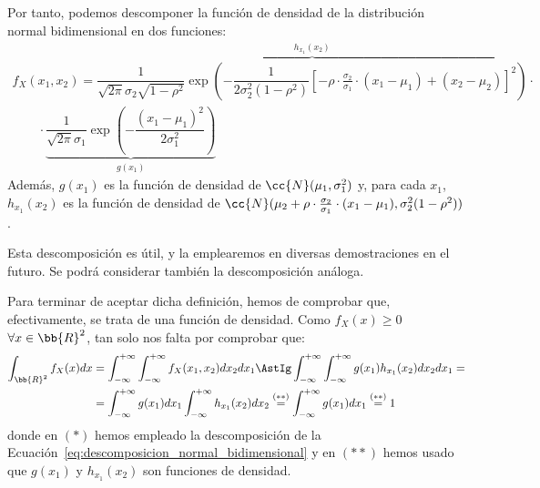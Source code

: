 Por tanto, podemos descomponer la función de densidad de la distribución normal bidimensional en dos funciones:
\begin{multline}\label{eq:descomposicion_normal_bidimensional}
    f_X(x_1,x_2)
    =\overbrace{\dfrac{1}{\sqrt{2\pi}\sigma_2\sqrt{1-\rho^2}}\exp\left(-\dfrac{1}{2\sigma_2^2(1-\rho^2)}\left[-\rho\cdot \frac{\sigma_2}{\sigma_1}\cdot (x_1-\mu_1)+ (x_2-\mu_2)\right]^2\right)}^{h_{x_1}(x_2)}
    \cdot\\\qquad \cdot \underbrace{\dfrac{1}{\sqrt{2\pi}\sigma_1}\exp\left(-\dfrac{(x_1-\mu_1)^2}{2\sigma_1^2}\right)}_{g(x_1)}
\end{multline}
Además, $g(x_1)$ es la función de densidad de $\cc{N}(\mu_1, \sigma_1^2)$ y, para cada $x_1$, $h_{x_1}(x_2)$ es la función de densidad de $\cc{N}(\mu_2+\rho\cdot \frac{\sigma_2}{\sigma_1}\cdot (x_1-\mu_1), \sigma_2^2(1-\rho^2))$.\\
\begin{comment}
Repitiendo el proceso con el término $\left(\frac{x_2-\mu_2}{\sigma_2}\right)^2$, obtenemos que:
\begin{align*}
    f_X(x_1,x_2)
    &=\overbrace{\dfrac{1}{\sqrt{2\pi}\sigma_2}\exp\left(-\dfrac{(x_2-\mu_2)^2}{2\sigma_2^2}\right)}^{p(x_2)}\cdot
    \cdot\\&\qquad \cdot\underbrace{\dfrac{1}{\sqrt{2\pi}\sigma_1\sqrt{1-\rho^2}}\exp\left(-\dfrac{1}{2\sigma_1^2(1-\rho^2)}\left[-\rho\cdot \frac{\sigma_1}{\sigma_2}\cdot (x_2-\mu_2)+ (x_1-\mu_1)\right]^2\right)}_{q_{x_2}(x_1)}
\end{align*}
En este caso, $p(x_2)$ es la función de densidad de $\cc{N}(\mu_2, \sigma_2^2)$ y, para cada $x_2$, $q_{x_2}(x_1)$ es la función de densidad de $\cc{N}(\mu_1+\rho\cdot \frac{\sigma_1}{\sigma_2}\cdot (x_2-\mu_2), \sigma_1^2(1-\rho^2))$.
\end{comment}
Esta descomposición es útil, y la emplearemos en diversas demostraciones en el futuro. Se podrá considerar también la descomposición análoga.


Para terminar de aceptar dicha definición, hemos de comprobar que, efectivamente, se trata de una función de densidad.
Como $f_X(x)\geq 0$ $\forall x\in \bb{R}^2$, tan solo nos falta por comprobar que:
\begin{align*}
    \int_{\bb{R}^2} f_X(x)dx
    &= \int_{-\infty}^{+\infty}\int_{-\infty}^{+\infty} f_X(x_1,x_2)dx_2dx_1
    \AstIg
    \int_{-\infty}^{+\infty}\int_{-\infty}^{+\infty} g(x_1)h_{x_1}(x_2)dx_2dx_1
    =\\&=
    \int_{-\infty}^{+\infty} g(x_1)dx_1\int_{-\infty}^{+\infty} h_{x_1}(x_2)dx_2
    \stackrel{(\ast\ast)}{=}
    \int_{-\infty}^{+\infty} g(x_1)dx_1
    \stackrel{(\ast\ast)}{=} 1
\end{align*}
donde en $(\ast)$ hemos empleado la descomposición de la Ecuación~\ref{eq:descomposicion_normal_bidimensional} y en $(\ast\ast)$ hemos usado que $g(x_1)$ y $h_{x_1}(x_2)$ son funciones de densidad.

